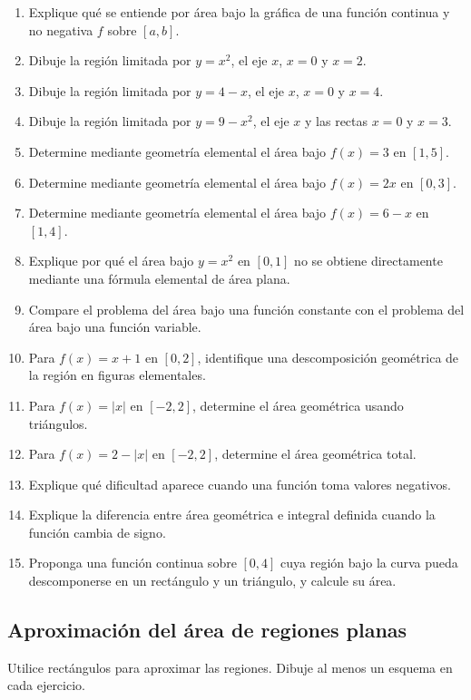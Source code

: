 \documentclass[12pt]{article}
\begin{document}
\begin{enumerate}[resume]
\item Explique qué se entiende por área bajo la gráfica de una función continua y no negativa $f$ sobre $[a,b]$.
\item Dibuje la región limitada por $y=x^2$, el eje $x$, $x=0$ y $x=2$.
\item Dibuje la región limitada por $y=4-x$, el eje $x$, $x=0$ y $x=4$.
\item Dibuje la región limitada por $y=9-x^2$, el eje $x$ y las rectas $x=0$ y $x=3$.
\item Determine mediante geometría elemental el área bajo $f(x)=3$ en $[1,5]$.
\item Determine mediante geometría elemental el área bajo $f(x)=2x$ en $[0,3]$.
\item Determine mediante geometría elemental el área bajo $f(x)=6-x$ en $[1,4]$.
\item Explique por qué el área bajo $y=x^2$ en $[0,1]$ no se obtiene directamente mediante una fórmula elemental de área plana.
\item Compare el problema del área bajo una función constante con el problema del área bajo una función variable.
\item Para $f(x)=x+1$ en $[0,2]$, identifique una descomposición geométrica de la región en figuras elementales.
\item Para $f(x)=|x|$ en $[-2,2]$, determine el área geométrica usando triángulos.
\item Para $f(x)=2-|x|$ en $[-2,2]$, determine el área geométrica total.
\item Explique qué dificultad aparece cuando una función toma valores negativos.
\item Explique la diferencia entre área geométrica e integral definida cuando la función cambia de signo.
\item Proponga una función continua sobre $[0,4]$ cuya región bajo la curva pueda descomponerse en un rectángulo y un triángulo, y calcule su área.
\end{enumerate}

\subsection{Aproximación del área de regiones planas}
Utilice rectángulos para aproximar las regiones. Dibuje al menos un esquema en cada ejercicio.
\end{document}
